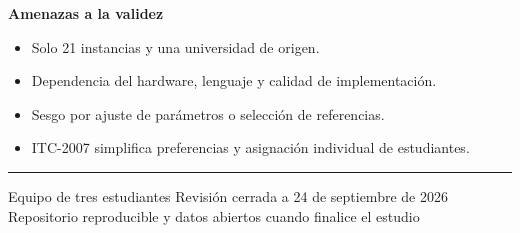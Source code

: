 \documentclass[10pt]{article}
\newcommand{\postersection}[1]{%
  \vspace{1.2mm}%
  {\color{burdeos}\fontsize{14.5}{16}\selectfont\bfseries #1}\par
  \vspace{0.5mm}{\color{burdeos}\rule{\linewidth}{1pt}}\vspace{0.7mm}
}
\begin{document}
\begin{minipage}[t][\textheight][t]{\textwidth}
\begin{minipage}[t]{0.316\textwidth}
\postersection{Amenazas a la validez}
\begin{itemize}
  \item Solo 21 instancias y una universidad de origen.
  \item Dependencia del hardware, lenguaje y calidad de implementaci\'on.
  \item Sesgo por ajuste de par\'ametros o selecci\'on de referencias.
  \item ITC-2007 simplifica preferencias y asignaci\'on individual de estudiantes.
\end{itemize}

\end{minipage}

\vfill
{\color{linea}\rule{\textwidth}{0.8pt}}\vspace{1mm}
{\color{gris}\small
Equipo de tres estudiantes \hfill Revisi\'on cerrada a 24 de septiembre de 2026 \hfill Repositorio reproducible y datos abiertos cuando finalice el estudio}

\end{minipage}
\end{document}
